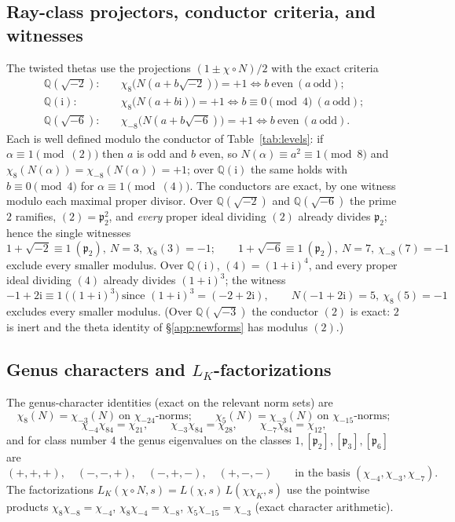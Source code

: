 \documentclass[11pt]{article}
\newcommand{\Qq}{\mathbb{Q}}
\newcommand{\ii}{\mathrm{i}}
\theoremstyle{definition}
\theoremstyle{remark}
\begin{document}
\subsection{Ray-class projectors, conductor criteria, and
witnesses}\label{app:ray}

The twisted thetas use the projections $(1\pm\chi\circ N)/2$ with the
exact criteria
\begin{align*}
  \Qq(\sqrt{-2}):&\quad \chi_8\bigl(N(a+b\sqrt{-2})\bigr)=+1
    \iff b\ \text{even}\ (a\ \text{odd});\\
  \Qq(\ii):&\quad \chi_8\bigl(N(a+b\ii)\bigr)=+1
    \iff b\equiv0\pmod4\ (a\ \text{odd});\\
  \Qq(\sqrt{-6}):&\quad \chi_{-8}\bigl(N(a+b\sqrt{-6})\bigr)=+1
    \iff b\ \text{even}\ (a\ \text{odd}).
\end{align*}
Each is well defined modulo the conductor of
Table~\ref{tab:levels}: if $\alpha\equiv1\pmod{(2)}$ then $a$ is odd
and $b$ even, so $N(\alpha)\equiv a^2\equiv1\pmod8$ and
$\chi_8(N(\alpha))=\chi_{-8}(N(\alpha))=+1$; over $\Qq(\ii)$ the same
holds with $b\equiv0\pmod4$ for $\alpha\equiv1\pmod{(4)}$. The
conductors are exact, by one witness modulo each maximal proper
divisor. Over $\Qq(\sqrt{-2})$ and $\Qq(\sqrt{-6})$ the prime $2$
ramifies, $(2)=\mathfrak p_2^2$, and \emph{every} proper ideal
dividing $(2)$ already divides $\mathfrak p_2$; hence the single
witnesses
\[
  1+\sqrt{-2}\equiv1\ (\mathfrak p_2),\ N=3,\ \chi_8(3)=-1;\qquad
  1+\sqrt{-6}\equiv1\ (\mathfrak p_2),\ N=7,\ \chi_{-8}(7)=-1
\]
exclude every smaller modulus. Over $\Qq(\ii)$,
$(4)=(1+\ii)^4$, and every proper ideal dividing $(4)$ already
divides $(1+\ii)^3$; the witness
\[
  -1+2\ii\equiv1\ \bigl((1+\ii)^3\bigr)\ \text{since }
  (1+\ii)^3=(-2+2\ii),\qquad N(-1+2\ii)=5,\ \chi_8(5)=-1
\]
excludes every smaller modulus. (Over $\Qq(\sqrt{-3})$ the
conductor $(2)$ is exact: $2$ is inert and the theta identity of
\S\ref{app:newforms} has modulus $(2)$.)

\subsection{Genus characters and \texorpdfstring{$L_K$}{L(K)}-factorizations}\label{app:genus}

The genus-character identities (exact on the relevant norm sets) are
\[
  \chi_8(N)=\chi_{-3}(N)\ \text{on $\chi_{-24}$-norms};\qquad
  \chi_5(N)=\chi_{-3}(N)\ \text{on $\chi_{-15}$-norms};
\]
\[
  \chi_{-4}\chi_{84}=\chi_{21},\qquad
  \chi_{-3}\chi_{84}=\chi_{28},\qquad
  \chi_{-7}\chi_{84}=\chi_{12},
\]
and for class number $4$ the genus eigenvalues on the classes
$1,[\mathfrak p_2],[\mathfrak p_3],[\mathfrak p_6]$ are
\[
  (+,+,+),\quad (-,-,+),\quad (-,+,-),\quad (+,-,-)
  \qquad\text{in the basis }(\chi_{-4},\chi_{-3},\chi_{-7}).
\]
The factorizations
$L_K(\chi\circ N,s)=L(\chi,s)\,L(\chi\chi_K,s)$ use the pointwise
products $\chi_8\chi_{-8}=\chi_{-4}$, $\chi_8\chi_{-4}=\chi_{-8}$,
$\chi_5\chi_{-15}=\chi_{-3}$ (exact character arithmetic).
\end{document}
